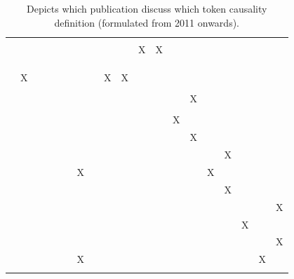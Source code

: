 \documentclass[11pt,a4paper]{book}
\theoremstyle{definition}
\theoremstyle{definition}
\theoremstyle{definition}
\theoremstyle{remark}
\begin{document}
\begin{table}
\begin{tabular}{lp{0.4cm}p{0.4cm}p{0.4cm}p{0.4cm}p{0.4cm}p{0.4cm}p{0.4cm}p{0.4cm}p{0.4cm}p{0.4cm}p{0.4cm}p{0.4cm}p{0.4cm}p{0.4cm}p{0.4cm}p{0.4cm}p{0.4cm}p{0.4cm}}
 \cite{halpern2016appropriate} 	& 	& 	& 	& 	& 	& 	& 	& 	& 	& 	& 	& 	& 	& 	& 	& 	& 	& 	\\
 \cite{blanchard2017cause}  	& 	& 	& 	& 	& 	& 	& 	& 	& 	& X	& X	& 	& 	& 	& 	& 	& 	& 	\\
 \cite{wright2017ness}  	& 	& 	& 	& 	& 	& 	& 	& 	& 	& 	& 	& 	& 	& 	& 	& 	& 	& 	\\
 \cite{icard2017normality} 	& 	& 	& 	& 	& 	& 	& 	& 	& 	& 	& 	& 	& 	& 	& 	& 	& 	& 	\\
 \cite{aleksandrowicz2017computational}  	& 	& 	& 	& 	& 	& 	& 	& 	& 	& 	& 	& 	& 	& 	& 	& 	& 	& 	\\
 \cite{fenton2017proposed}  	& X	& 	& 	& 	& 	& 	& 	& X	& X	& 	& 	& 	& 	& 	& 	& 	& 	& 	\\
 \cite{lagnado2017causation}  	& 	& 	& 	& 	& 	& 	& 	& 	& 	& 	& 	& 	& 	& 	& 	& 	& 	& 	\\
 \cite{bochman2018actual}  	& 	& 	& 	& 	& 	& 	& 	& 	& 	& 	& 	& 	& X	& 	& 	& 	& 	& 	\\
 \cite{ibeling2018conditional}  	& 	& 	& 	& 	& 	& 	& 	& 	& 	& 	& 	& 	& 	& 	& 	& 	& 	& 	\\
 \cite{beckers2018principled} 	& 	& 	& 	& 	& 	& 	& 	& 	& 	& 	& 	& X	& 	& 	& 	& 	& 	& 	\\
 \cite{bochman2018laws}  	& 	& 	& 	& 	& 	& 	& 	& 	& 	& 	& 	& 	& X	& 	& 	& 	& 	& 	\\
 \cite{denecker2018causal}  	& 	& 	& 	& 	& 	& 	& 	& 	& 	& 	& 	& 	& 	& 	& X	& 	& 	& 	\\
 \cite{batusov2018situation}  	& 	& 	& 	& 	& 	& X	& 	& 	& 	& 	& 	& 	& 	& X	& 	& 	& 	& 	\\
 \cite{denecker2019explaining}  	& 	& 	& 	& 	& 	& 	& 	& 	& 	& 	& 	& 	& 	& 	& X	& 	& 	& 	\\
 \cite{liepicna2019evaluation}  	& 	& 	& 	& 	& 	& 	& 	& 	& 	& 	& 	& 	& 	& 	& 	& 	& 	& X	\\
 \cite{leblanc2019explaining} 	& 	& 	& 	& 	& 	& 	& 	& 	& 	& 	& 	& 	& 	& 	& 	& X	& 	& 	\\
 \cite{liepicna2020arguing} 	& 	& 	& 	& 	& 	& 	& 	& 	& 	& 	& 	& 	& 	& 	& 	& 	& 	& X	\\
 \cite{khannecessary}  	& 	& 	& 	& 	& 	& X	& 	& 	& 	& 	& 	& 	& 	& 	& 	& 	& X	& 	\\
 \cite{ibeling2020probabilistic}  	& 	& 	& 	& 	& 	& 	& 	& 	& 	& 	& 	& 	& 	& 	& 	& 	& 	& 	\\

\bottomrule
\end{tabular}
\caption{Depicts which publication discuss which token causality definition (formulated from 2011 onwards).  }
\label{tab:definitions-2}
\end{table}
\end{document}
